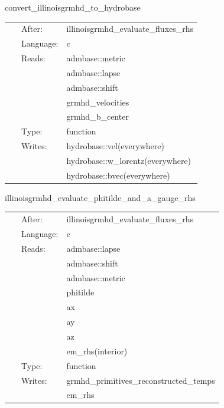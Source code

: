 \documentclass{article}
\begin{document}
\hspace{5mm} convert\_illinoisgrmhd\_to\_hydrobase 

\hspace{5mm}{\it convert needed hydrobase variables for nrpyleakage } 


\hspace{5mm}

 \begin{tabular*}{160mm}{cll} 
~ & After:  & illinoisgrmhd\_evaluate\_fluxes\_rhs \\ 
~ & Language:  & c \\ 
~ & Reads:  & admbase::metric \\ 
~& ~ &admbase::lapse\\ 
~& ~ &admbase::shift\\ 
~& ~ &grmhd\_velocities\\ 
~& ~ &grmhd\_b\_center\\ 
~ & Type:  & function \\ 
~ & Writes:  & hydrobase::vel(everywhere) \\ 
~& ~ &hydrobase::w\_lorentz(everywhere)\\ 
~& ~ &hydrobase::bvec(everywhere)\\ 
\end{tabular*} 


\vspace{5mm}


\hspace{5mm} illinoisgrmhd\_evaluate\_phitilde\_and\_a\_gauge\_rhs 

\hspace{5mm}{\it evaluate phitilde rhs and gauge contributions to a\_i rhs } 


\hspace{5mm}

 \begin{tabular*}{160mm}{cll} 
~ & After:  & illinoisgrmhd\_evaluate\_fluxes\_rhs \\ 
~ & Language:  & c \\ 
~ & Reads:  & admbase::lapse \\ 
~& ~ &admbase::shift\\ 
~& ~ &admbase::metric\\ 
~& ~ &phitilde\\ 
~& ~ &ax\\ 
~& ~ &ay\\ 
~& ~ &az\\ 
~& ~ &em\_rhs(interior)\\ 
~ & Type:  & function \\ 
~ & Writes:  & grmhd\_primitives\_reconstructed\_temps \\ 
~& ~ &em\_rhs\\ 
\end{tabular*} 
\end{document}

